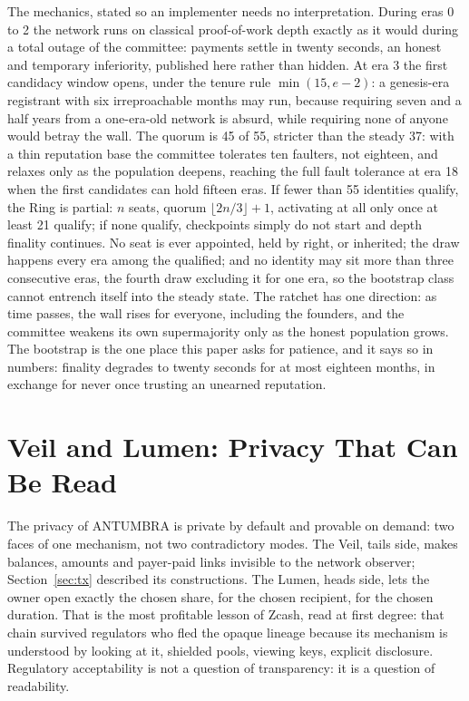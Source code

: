 The mechanics, stated so an implementer needs no interpretation. During
eras 0 to 2 the network runs on classical proof-of-work depth exactly as
it would during a total outage of the committee: payments settle in
twenty seconds, an honest and temporary inferiority, published here
rather than hidden. At era 3 the first candidacy window opens, under the
tenure rule $\min(15, e - 2)$: a genesis-era registrant with six
irreproachable months may run, because requiring seven and a half years
from a one-era-old network is absurd, while requiring none of anyone
would betray the wall. The quorum is 45 of 55, stricter than the steady
37: with a thin reputation base the committee tolerates ten faulters, not
eighteen, and relaxes only as the population deepens, reaching the full
fault tolerance at era 18 when the first candidates can hold fifteen
eras. If fewer than 55 identities qualify, the Ring is partial: $n$
seats, quorum $\lfloor 2n/3 \rfloor + 1$, activating at all only once at
least 21 qualify; if none qualify, checkpoints simply do not start and
depth finality continues. No seat is ever appointed, held by right, or
inherited; the draw happens every era among the qualified; and no
identity may sit more than three consecutive eras, the fourth draw
excluding it for one era, so the bootstrap class cannot entrench itself
into the steady state. The ratchet has one direction: as time passes,
the wall rises for everyone, including the founders, and the committee
weakens its own supermajority only as the honest population grows. The
bootstrap is the one place this paper asks for patience, and it says so
in numbers: finality degrades to twenty seconds for at most eighteen
months, in exchange for never once trusting an unearned reputation.

\section{Veil and Lumen: Privacy That Can Be Read}\label{sec:veil}

The privacy of ANTUMBRA is private by default and provable on demand:
two faces of one mechanism, not two contradictory modes. The Veil, tails
side, makes balances, amounts and payer-paid links invisible to the
network observer; Section~\ref{sec:tx} described its constructions. The
Lumen, heads side, lets the owner open exactly the chosen share, for the
chosen recipient, for the chosen duration. That is the most profitable
lesson of Zcash, read at first degree: that chain survived regulators who
fled the opaque lineage because its mechanism is understood by looking at
it, shielded pools, viewing keys, explicit disclosure. Regulatory
acceptability is not a question of transparency: it is a question of
readability.


